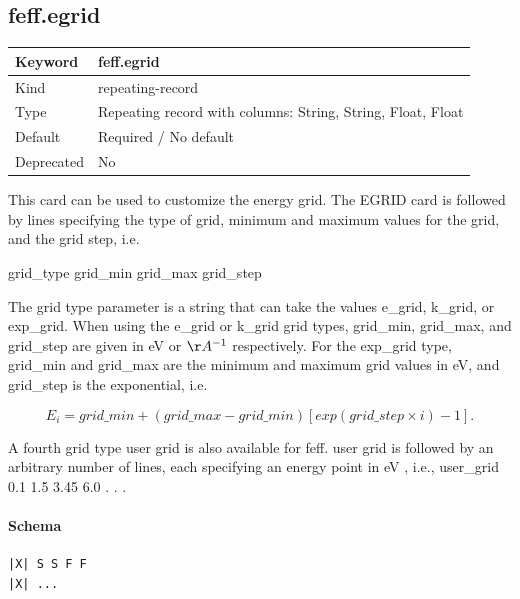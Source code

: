 \documentclass[11pt]{article}
\begin{document}
{{{\subsection{feff.egrid}
\label{kw:feff-egrid}
\begin{longtable}{|p{1.5in}|p{4.5in}|}
\hline
Keyword & feff.egrid \\
\hline
Kind & repeating-record \\
\hline
Type & Repeating record with columns: String, String, Float, Float \\
\hline
Default & Required / No default \\
\hline
Deprecated & No \\
\hline
\end{longtable}
 This card can be used to customize the energy grid. The EGRID card is followed by lines
 specifying the type of grid, minimum and maximum values for the grid, and the grid step, i.e.

 grid\_type grid\_min grid\_max grid\_step

 The grid type parameter is a string that can take the values e\_grid, k\_grid, or exp\_grid. When
 using the e\_grid or k\_grid grid types, grid\_min, grid\_max, and grid\_step are given in eV or $\AA^{-1}$
 respectively. For the exp\_grid type, grid\_min and grid\_max are the minimum and maximum
 grid values in eV, and grid\_step is the exponential, i.e.

  $$E_i = grid{\_}min + (grid{\_}max-grid{\_}min)[exp(grid{\_}step \times i) - 1].$$

 A fourth grid type user grid is also available for feff. user grid is followed by an arbitrary
 number of lines, each specifying an energy point in eV , i.e.,
 user\_grid
 0.1
 1.5
 3.45
 6.0
 .
 .
 .

\paragraph{Schema}
\begin{Verbatim}
|X| S S F F
|X| ...
\end{Verbatim}

}}}
\end{document}
